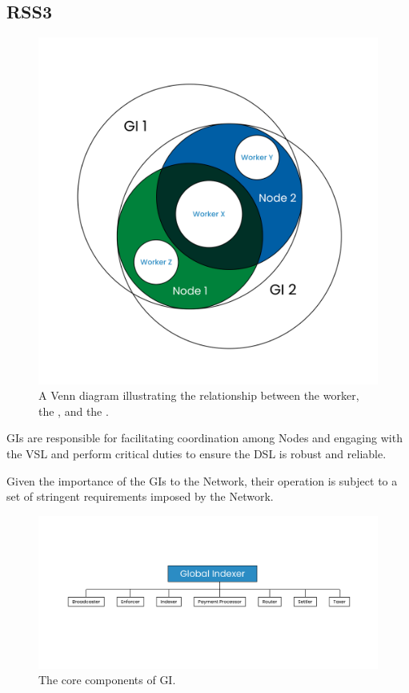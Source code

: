 \subsection{RSS3 }
\label{subsec:GI}

{
    \begin{figure}[tb!]
        \centering
        \includegraphics[width=0.7\columnwidth]{figures/GI.png}
        \caption{A Venn diagram illustrating the relationship between the worker, the , and the .}
        \label{fig:GI}
    \end{figure}
}

\glspl{GI} are responsible for facilitating coordination among \glspl{Node} and engaging with the \gls{VSL} and perform critical duties to ensure the \gls{DSL} is robust and reliable.

Given the importance of the \glspl{GI} to the Network, their operation is subject to a set of stringent requirements imposed by the Network.

{
    \begin{figure}[tb!]
        \centering
        \includegraphics[width=1\columnwidth]{figures/GI-components.png}
        \caption{The core components of \gls{GI}.}
        \label{fig:GI-components}
    \end{figure}
}

